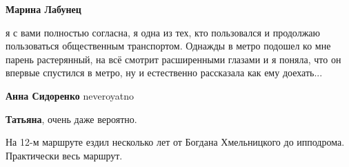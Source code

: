 \begin{itemize}
\begin{itemize} %
\textbf{Марина Лабунец} 

я с вами полностью согласна, я одна из тех, кто пользовался и продолжаю
пользоваться общественным транспортом. Однажды в метро подошел ко мне парень
растерянный, на всё смотрит расширенными глазами и я поняла, что он впервые
спустился в метро, ну и естественно рассказала как ему доехать...

\textbf{Анна Сидоренко} neveroyatno

\textbf{Татьяна}, очень даже вероятно.
\end{itemize} %


На 12-м маршруте ездил несколько лет от Богдана Хмельницкого до ипподрома.
Практически весь маршрут.


\end{itemize} %

